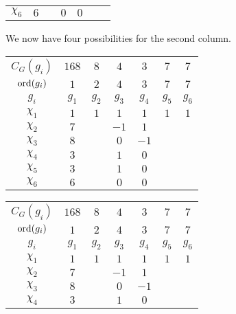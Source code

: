 \begin{boxexample}[Constructing the Character Table of $G = \PSL{2, 7}$]
\begin{table}[H]
\begin{tabular}{|c|cccccc|}
            $\chi_6$ & $6$ & & $0$ & $0$ & & \\
        \end{tabular}
    \end{table}
    We now have four possibilities for the second column. %
    \begin{table}[H]
        \centering
        \begin{subtable}{0.45\linewidth}
            \begin{tabular}{|c|cccccc|}
                $C_G(g_i)$ & $168$ & $8$ & $4$ & $3$ & $7$ & $7$ \\
                $\operatorname{ord}\!\left( g_i \right)$ & $1$ & $2$ & $4$ & $3$ & $7$ & $7$ \\
                $g_i$ & $g_1$ & $g_2$ & $g_3$ & $g_4$ & $g_5$ & $g_6$ \\
                \hline
                $\chi_1$ & $1$ & $1$ & $1$ & $1$ & $1$ & $1$ \\
                $\chi_2$ & $7$ & & $-1$ & $1$ & & \\
                $\chi_3$ & $8$ & & $0$ & $-1$ & & \\
                $\chi_4$ & $3$ & & $1$ & $0$ & & \\
                $\chi_5$ & $3$ & & $1$ & $0$ & & \\
                $\chi_6$ & $6$ & & $0$ & $0$ & & \\
            \end{tabular}
        \end{subtable}
        \hspace{0.05\linewidth}
        \begin{subtable}{0.45\linewidth}
            \begin{tabular}{|c|cccccc|}
                $C_G(g_i)$ & $168$ & $8$ & $4$ & $3$ & $7$ & $7$ \\
                $\operatorname{ord}\!\left( g_i \right)$ & $1$ & $2$ & $4$ & $3$ & $7$ & $7$ \\
                $g_i$ & $g_1$ & $g_2$ & $g_3$ & $g_4$ & $g_5$ & $g_6$ \\
                \hline
                $\chi_1$ & $1$ & $1$ & $1$ & $1$ & $1$ & $1$ \\
                $\chi_2$ & $7$ & & $-1$ & $1$ & & \\
                $\chi_3$ & $8$ & & $0$ & $-1$ & & \\
                $\chi_4$ & $3$ & & $1$ & $0$ & & \\

\end{tabular}
\end{subtable}
\end{table}
\end{boxexample}
